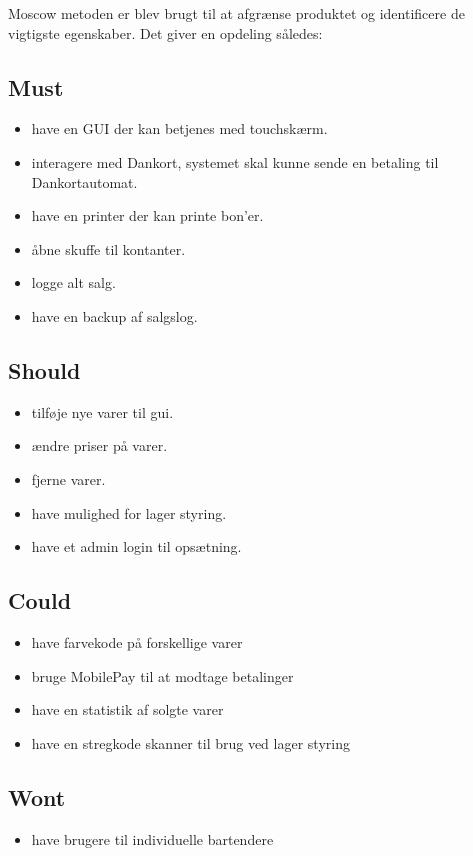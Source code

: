 Moscow metoden er blev brugt til at afgrænse produktet og identificere de vigtigste egenskaber. Det giver en opdeling således:

\subsection{Must}
\begin{itemize}
\item have en GUI der kan betjenes med touchskærm.
\item interagere med Dankort, systemet skal kunne sende en betaling til Dankortautomat.
\item have en printer der kan printe bon'er.
\item åbne skuffe til kontanter.
\item logge alt salg.
\item have en backup af salgslog.
\end{itemize}

\subsection{Should}
\begin{itemize}
\item tilføje nye varer til gui.
\item ændre priser på varer.
\item fjerne varer.
\item have mulighed for lager styring.
\item have et admin login til opsætning.
\end{itemize}

\subsection{Could}
\begin{itemize}
\item have farvekode på forskellige varer
\item bruge MobilePay til at modtage betalinger
\item have en statistik af solgte varer
\item have en stregkode skanner til brug ved lager styring
\end{itemize}

\subsection{Wont}
\begin{itemize}
\item have brugere til individuelle bartendere
\end{itemize}